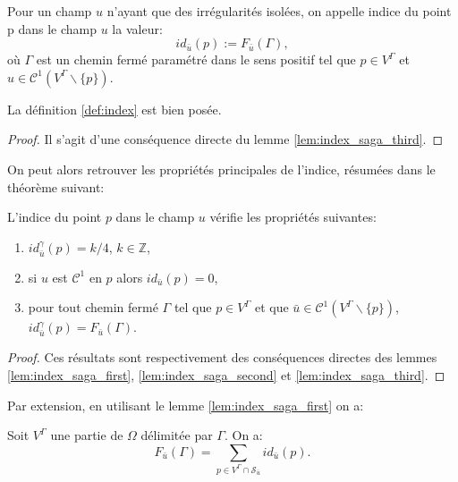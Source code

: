 \begin{definition}
    Pour un champ $u$ n'ayant que des irrégularités isolées, on appelle indice du point p dans le champ $u$ la valeur:
    $$
    id_{\bar{u}}(p):=F_{\bar{u}}(\Gamma),
    $$
    où $\Gamma$ est un chemin fermé paramétré dans le sens positif tel que $p\in V^\Gamma$ et $u\in\mathcal{C}^1(V^\Gamma\backslash\{p\})$.
    \label{def:index}
\end{definition}

\begin{proposition}
    La définition \ref{def:index} est bien posée.
\end{proposition}

\begin{proof}
    Il s'agit d'une conséquence directe du lemme \ref{lem:index_saga_third}.
\end{proof}

On peut alors retrouver les propriétés principales de l'indice, résumées dans le théorème suivant:

\begin{theorem}
    \label{thm:index}
    L'indice du point $p$ dans le champ $u$ vérifie les propriétés suivantes:
    \begin{enumerate}
        \item $id_{\bar{u}}^\gamma(p)=k/4$, $k\in\mathbb{Z}$,
        \item si $u$ est $\mathcal{C}^1$ en $p$ alors $id_{\bar{u}}(p)=0$,
        \item pour tout chemin fermé $\Gamma$ tel que $p\in V^\Gamma$ et que $\bar{u}\in\mathcal{C}^1(V^\Gamma\backslash\{p\})$, $id_{\bar{u}}^\gamma(p)=F_{\bar{u}}(\Gamma)$.
    \end{enumerate}
\end{theorem}

\begin{proof}
    Ces résultats sont respectivement des conséquences directes des lemmes \ref{lem:index_saga_first}, \ref{lem:index_saga_second} et \ref{lem:index_saga_third}.
\end{proof}

Par extension, en utilisant le lemme \ref{lem:index_saga_first} on a:

\begin{corollary}
    \label{cor:sum_index}
Soit $V^\Gamma$ une partie de $\Omega$ délimitée par $\Gamma$. On a:
\begin{equation}
\label{eqn:Fu_sum}
 F_{\bar{u}}(\Gamma)=\sum_{p\in V^\Gamma\cap\mathcal{S}_{\bar{u}}} id_{\bar{u}}(p).
\end{equation}
\end{corollary}


